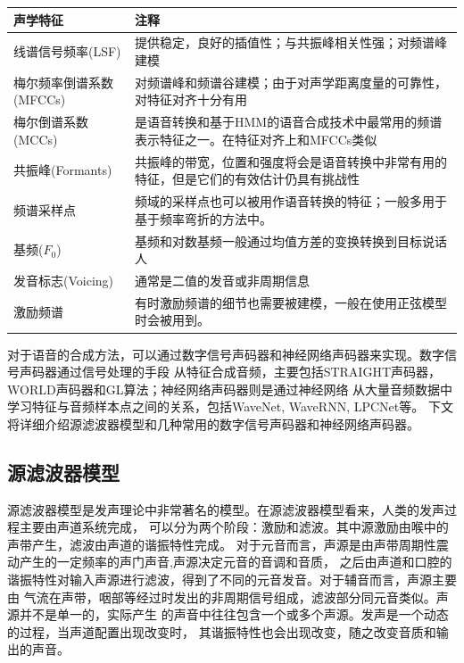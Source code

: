 \begin{table}[!hpt]
    \label{tab:vc_feats}
    \centering
    \begin{tabular}{p{}p{}} 
        \toprule
        声学特征 & 注释　\\
        \midrule
        线谱信号频率(LSF) & 提供稳定，良好的插值性；与共振峰相关性强；对频谱峰建模　\\
        梅尔频率倒谱系数(MFCCs) & 对频谱峰和频谱谷建模；由于对声学距离度量的可靠性，对特征对齐十分有用 \\
        梅尔倒谱系数(MCCs) & 是语音转换和基于HMM的语音合成技术中最常用的频谱表示特征之一。在特征对齐上和MFCCs类似　\\
        共振峰(Formants) & 共振峰的带宽，位置和强度将会是语音转换中非常有用的特征，但是它们的有效估计仍具有挑战性　\\
        频谱采样点 & 频域的采样点也可以被用作语音转换的特征；一般多用于基于频率弯折的方法中。\\
        \midrule
        基频($F_0$) & 基频和对数基频一般通过均值方差的变换转换到目标说话人 \\
        \midrule
        发音标志(Voicing) & 通常是二值的发音或非周期信息 \\
        \midrule
        激励频谱 & 有时激励频谱的细节也需要被建模，一般在使用正弦模型时会被用到。\\
        \bottomrule
    \end{tabular}
\end{table}

对于语音的合成方法，可以通过数字信号声码器和神经网络声码器来实现。数字信号声码器通过信号处理的手段
从特征合成音频，主要包括STRAIGHT声码器，WORLD声码器和GL算法；神经网络声码器则是通过神经网络
从大量音频数据中学习特征与音频样本点之间的关系，包括WaveNet, WaveRNN, LPCNet等。
下文将详细介绍源滤波器模型和几种常用的数字信号声码器和神经网络声码器。

\subsection{源滤波器模型}
源滤波器模型是发声理论中非常著名的模型。在源滤波器模型看来，人类的发声过程主要由声道系统完成，
可以分为两个阶段：激励和滤波。其中源激励由喉中的声带产生，滤波由声道的谐振特性完成。
对于元音而言，声源是由声带周期性震动产生的一定频率的声门声音,声源决定元音的音调和音质，
之后由声道和口腔的谐振特性对输入声源进行滤波，得到了不同的元音发音。对于辅音而言，声源主要由
气流在声带，咽部等经过时发出的非周期信号组成，滤波部分同元音类似。声源并不是单一的，实际产生
的声音中往往包含一个或多个声源。发声是一个动态的过程，当声道配置出现改变时，
其谐振特性也会出现改变，随之改变音质和输出的声音。

